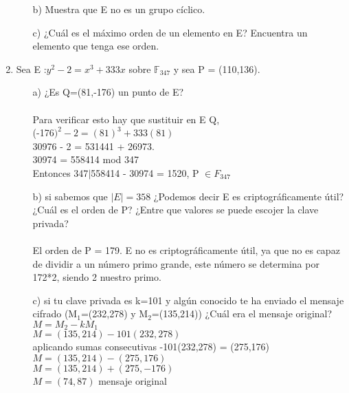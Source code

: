 \documentclass[10pt,a4paper]{article}
\begin{document}
\begin{enumerate}
\begin{itemize}
\item[b)] Muestra que E no es un grupo cíclico.
\item[c)] ¿Cuál es el máximo orden de un elemento en E? Encuentra un elemento que tenga ese orden.
\end{itemize}
\item Sea E :$y^{2}-2=x^{3}+333x$ sobre $\mathbb{F}_{347}$ y sea P = (110,136).
\begin{itemize}
\item[a)] ¿Es Q=(81,-176) un punto de E?\\
\\Para verificar esto hay que sustituir en E Q, \\
(-176$)^{2} - 2= (81)^{3} + 333(81) $\\
30976 - 2 = 531441 + 26973. \\
30974 = 558414 mod 347 \\
Entonces 347$|$558414 - 30974 = 1520, P $\in F_{347}$
\\
\item[b)] si sabemos que $|E| = 358$ ¿Podemos decir E es criptográficamente útil?
¿Cuál es el orden de P? ¿Entre que valores se puede escojer la clave privada?
\\\\El orden de P = 179. E no es criptográficamente útil, ya que no es capaz de dividir a un número primo grande, este número se determina por 172*2, siendo 2 nuestro primo.\\
\item[c)] si tu clave privada es k=101 y algún conocido te ha enviado el mensaje cifrado (M$_1$=(232,278) y M$_2$=(135,214)) ¿Cuál era el mensaje original?\\
$M=M_2 - kM_1$\\
$M=(135,214)-101(232,278)$\\
aplicando sumas consecutivas -101(232,278) = (275,176)\\
$M =(135,214)-(275,176)$\\
$M =(135,214)+(275,-176)$\\
$M =(74,87)$ mensaje original\\


\end{itemize}
\end{enumerate}
\end{document}
